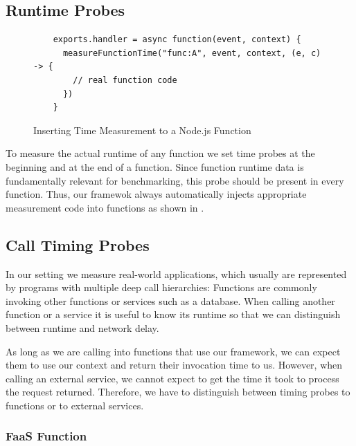 \documentclass[../main.tex]{subfiles}
\begin{document}
\subsection{Runtime Probes}%
\label{sub:runtimeProbes}

\begin{figure}
  \begin{tcolorbox}
    \begin{verbatim}
    exports.handler = async function(event, context) {
      measureFunctionTime("func:A", event, context, (e, c) -> {
        // real function code
      })
    }
    \end{verbatim}
  \end{tcolorbox}
\caption{Inserting Time Measurement to a Node.js Function}
\label{fig:timeMeasurementCode}
\end{figure}

To measure the actual runtime of any function we set time probes at the beginning and at the end of a function. 
Since function runtime data is fundamentally relevant for benchmarking, this probe should be present in every function.
Thus, our framewok always automatically injects appropriate measurement code into functions as shown
in . 

\subsection{Call Timing Probes}%
\label{sub:callingTimeProbes}

In our setting we measure real-world applications, which usually are represented by programs with multiple deep call hierarchies:
Functions are commonly invoking other functions or services such as a database. 
When calling another function or a service it is useful to know its runtime so that we can distinguish between runtime and network delay.

As long as we are calling into functions that use our framework, 
we can expect them to use our context and return their invocation time to us. 
However, when calling an external service, we cannot expect to get the time it took to process the request returned. 
Therefore, we have to distinguish between timing probes to functions or to external services.

\subsubsection{FaaS Function}%
\label{ssub:callingTimeProbeFunction}
\end{document}
